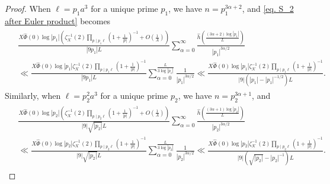 \documentclass[11pt]{amsart}
\numberwithin{equation}{section}
\theoremstyle{remark}
\begin{document}
\begin{proof}
When $\ell=p_1a^3$ for a unique prime $p_1$, we have $n=p_1^{3\alpha+2}$, and \eqref{eq. S_2 after Euler product} becomes
\begin{align}
\label{eq. main term 2}
 \begin{split}
    &\frac{X\widehat{\Phi}(0)\log|p_1|\left(\zeta^{-1}_\mathcal{K}(2)  \prod_{p\mid p_1\ell}(1+\frac{1}{|p|})^{-1}+O\left(\frac{1}{A}\right)\right)}{|9 p_1|L}
    \sum_{\alpha=0}^\infty
    \frac{\hat{h}\left(\frac{(3\alpha+2)\log |p_1|}{L}\right)}{|p_1|^{3\alpha/2}} 
    \\
    &\ll
    \frac{X\widehat{\Phi}(0)\log|p_1|\zeta^{-1}_\mathcal{K}(2)  \prod_{p\mid p_1\ell}(1+\frac{1}{|p|})^{-1}}{|9 p_1|L}
    \sum_{\alpha=0}^{\frac{L}{3\log|p_1|}}
    \frac{1}{|p_1|^{3\alpha/2}}
    \ll
 \frac{X\widehat{\Phi}(0)\log|p_1|\zeta^{-1}_\mathcal{K}(2)  \prod_{p\mid p_1 \ell }(1+\frac{1}{|p|})^{-1}}{|9|(|p_1|-|p_1|^{-1/2})L}.
  \end{split}
\end{align}
Similarly, when $\ell=p_2^2a^3$ for a unique prime $p_2$, we have $n=p_2^{3\alpha+1}$, and
\begin{align}
\label{eq. main term 3}
 \begin{split}
    &\frac{X\widehat{\Phi}(0)\log|p_2|\left(\zeta^{-1}_\mathcal{K}(2)  \prod_{p\mid p_2\ell}(1+\frac{1}{|p|})^{-1}+O\left(\frac{1}{A}\right)\right)}{|9|\sqrt{|p_2|} L}
    \sum_{\alpha=0}^\infty
    \frac{\hat{h}\left(\frac{(3\alpha+1)\log |p_2|}{L}\right)}{|p_2|^{3\alpha/2}} 
    \\
    &\ll
    \frac{X\widehat{\Phi}(0)\log|p_2|\zeta^{-1}_\mathcal{K}(2)  \prod_{p\mid p_2\ell}(1+\frac{1}{|p|})^{-1}}{|9|\sqrt{|p_2|}L}
    \sum_{\alpha=0}^{\frac{L}{3\log|p_2|}}
    \frac{1}{|p_2|^{3\alpha/2}}
    \ll
 \frac{X\widehat{\Phi}(0)\log|p_2|\zeta^{-1}_\mathcal{K}(2)  \prod_{p\mid p_2 \ell }(1+\frac{1}{|p|})^{-1}}{|9|(\sqrt{|p_2|}-|p_2|^{-1})L}.
  \end{split}
\end{align}


\end{proof}
\end{document}
